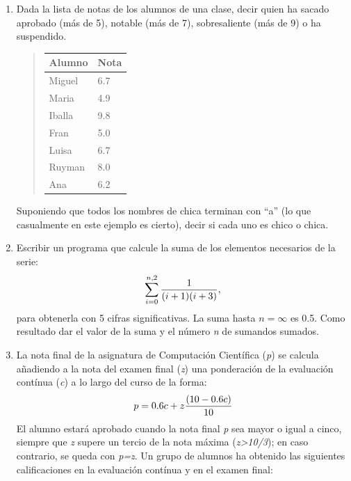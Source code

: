 \documentclass[letterpaper,10pt,spanish]{sphinxmanual}
\begin{document}
\begin{enumerate}
\item {} 
Dada la lista de notas de los alumnos de una clase, decir quien ha sacado aprobado (más de 5), notable (más de 7), sobresaliente (más de 9) o ha suspendido.
\begin{quote}

\begin{tabulary}{\linewidth}{|L|L|}
\hline
\textbf{
Alumno
} & \textbf{
Nota
}\\
\hline

Miguel
 & 
6.7
\\

Maria
 & 
4.9
\\

Iballa
 & 
9.8
\\

Fran
 & 
5.0
\\

Luisa
 & 
6.7
\\

Ruyman
 & 
8.0
\\

Ana
 & 
6.2
\\
\hline
\end{tabulary}

\end{quote}

Suponiendo que todos los nombres de chica terminan con ``a'' (lo que casualmente en este ejemplo es cierto), decir si cada uno es chico o chica.

\item {} 
Escribir un programa que calcule la suma de los elementos necesarios de la serie:
\begin{gather}
\begin{split}\sum_{i=0}^{n, 2} \frac{1}{(i+1)(i+3)},\end{split}\notag
\end{gather}
para obtenerla con 5 cifras significativas. La suma hasta $n=\infty$ es 0.5. Como resultado dar el valor de la suma y el número \emph{n} de sumandos sumados.

\item {} 
La nota final de la asignatura de Computación Científica (\emph{p}) se calcula añadiendo a la nota del  examen final (\emph{z}) una ponderación de la evaluación contínua (\emph{c}) a lo largo del curso de la forma:
\begin{gather}
\begin{split}p = 0.6c + z \frac{(10 - 0.6c)}{10}\end{split}\notag
\end{gather}
El alumno estará aprobado cuando la nota final \emph{p} sea mayor o igual a cinco, siempre que \emph{z} supere un tercio de la nota máxima (\emph{z\textgreater{}10/3}); en caso contrario, se queda con \emph{p=z}. Un grupo de alumnos ha obtenido las siguientes calificaciones en la evaluación contínua y en el examen final:


\end{enumerate}
\end{document}
